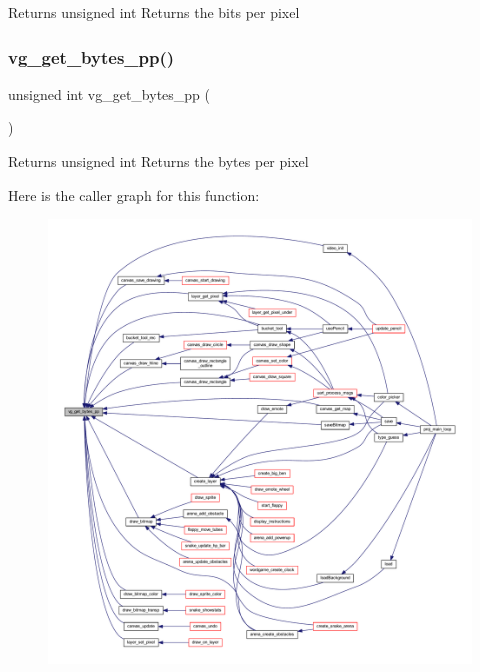 \begin{DoxyReturn}{Returns}
unsigned int Returns the bits per pixel 
\end{DoxyReturn}
\mbox{\label{group__video_gad5d72716b0e4b468c37027482a707763}} 
\subsubsection{\texorpdfstring{vg\+\_\+get\+\_\+bytes\+\_\+pp()}{vg\_get\_bytes\_pp()}}
{\footnotesize\ttfamily unsigned int vg\+\_\+get\+\_\+bytes\+\_\+pp (\begin{DoxyParamCaption}{ }\end{DoxyParamCaption})}

\begin{DoxyReturn}{Returns}
unsigned int Returns the bytes per pixel 
\end{DoxyReturn}
Here is the caller graph for this function\+:\nopagebreak
\begin{figure}[H]
\begin{center}
\leavevmode
\includegraphics[width=350pt]{group__video_gad5d72716b0e4b468c37027482a707763_icgraph}
\end{center}
\end{figure}
\mbox{\label{group__video_gaa4a211ebfc5c87a0072eaf9bd03e3a56}} 
